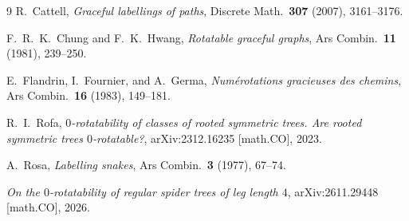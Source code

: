 \documentclass[11pt]{article}
\begin{document}
\begin{thebibliography}{9}
R.~Cattell, \emph{Graceful labellings of paths}, Discrete Math.\ \textbf{307} (2007), 3161--3176.

F.~R.~K.~Chung and F.~K.~Hwang, \emph{Rotatable graceful graphs}, Ars Combin.\ \textbf{11} (1981), 239--250.

E.~Flandrin, I.~Fournier, and A.~Germa, \emph{Num\'erotations gracieuses des chemins}, Ars Combin.\ \textbf{16} (1983), 149--181.

R.~I.~Rofa, \emph{$0$-rotatability of classes of rooted symmetric trees. Are rooted symmetric trees $0$-rotatable?}, arXiv:2312.16235 [math.CO], 2023.

A.~Rosa, \emph{Labelling snakes}, Ars Combin.\ \textbf{3} (1977), 67--74.

\emph{On the $0$-rotatability of regular spider trees of leg length $4$}, arXiv:2611.29448 [math.CO], 2026.
\end{thebibliography}
\end{document}
